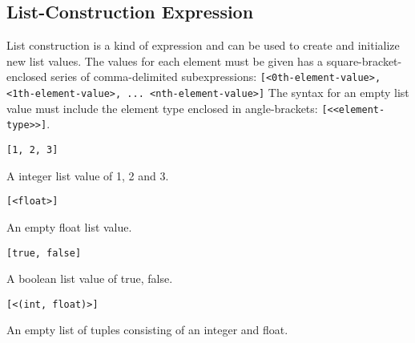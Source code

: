 
\subsection{List-Construction Expression}
{
	List construction is a kind of expression and can be
	used to create and initialize new list values.
	The values for each element must be given has a square-bracket-enclosed
	series of comma-delimited
	subexpressions: \texttt{[<0th-element-value>, <1th-element-value>, ... <nth-element-value>]}
	The syntax for an empty list value must include the element type enclosed
	in angle-brackets: \texttt{[<<element-type>>]}.
	
	\begin{itemize}
	{
		\item[] \texttt{[1, 2, 3]}
		
			A integer list value of 1, 2 and 3.
		
		\item[] \texttt{[<float>]}
		
			An empty float list value.
		
		\item[] \texttt{[true, false]}
		
			A boolean list value of true, false.
		
		\item[] \texttt{[<(int, float)>]}
		
			An empty list of tuples consisting of an integer and float.
	}
	\end{itemize}
}
